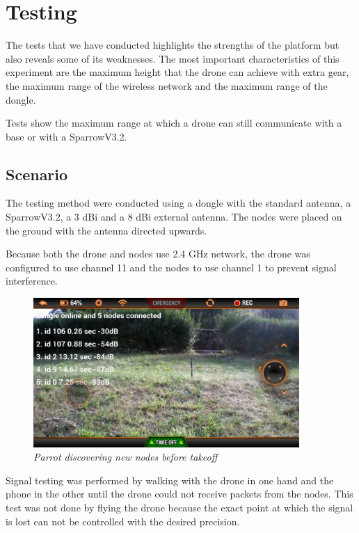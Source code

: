 \normalfont\normalsize
\chapter{Testing}

The tests that we have conducted highlights the strengths of the platform but also reveals some of its weaknesses.
The most important characteristics of this experiment are the maximum height that the drone  can achieve with extra gear, the maximum range of the wireless network and the maximum range of the dongle.

Tests show the maximum range at which a drone can still communicate with a base or with a SparrowV3.2.


\section{Scenario}

The testing method were conducted using a dongle with the standard antenna, a SparrowV3.2, a 3 dBi and a 8 dBi external antenna. The nodes were placed on the ground with the antenna directed upwards.

Because both the drone and nodes use 2.4 GHz network, the drone was configured to use channel 11 and the nodes to use channel 1 to prevent signal interference.

\begin{figure}[ht]
\begin{center}
\includegraphics[width=0.9\textwidth]{img/parrot_test.png}
\end{center}
\caption{\small \itshape{Parrot discovering new nodes before takeoff}}
\end{figure}

Signal testing was performed by walking with the drone in one hand and the phone in the other until the drone could not receive packets from the nodes. This test was not done by flying the drone because the exact point at which the signal is lost can not be controlled with the desired precision.



